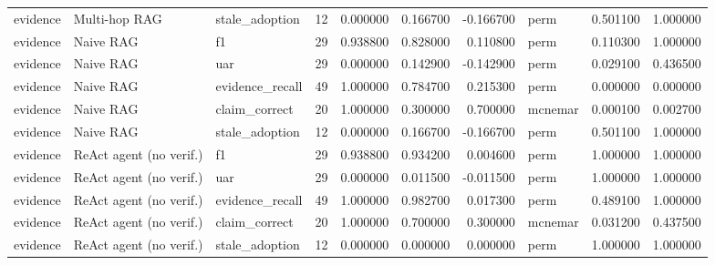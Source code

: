\begin{table}
\begin{tabular}{lllrrrrlrr}
evidence & Multi-hop RAG & stale\_adoption & 12 & 0.000000 & 0.166700 & -0.166700 & perm & 0.501100 & 1.000000 \\
evidence & Naive RAG & f1 & 29 & 0.938800 & 0.828000 & 0.110800 & perm & 0.110300 & 1.000000 \\
evidence & Naive RAG & uar & 29 & 0.000000 & 0.142900 & -0.142900 & perm & 0.029100 & 0.436500 \\
evidence & Naive RAG & evidence\_recall & 49 & 1.000000 & 0.784700 & 0.215300 & perm & 0.000000 & 0.000000 \\
evidence & Naive RAG & claim\_correct & 20 & 1.000000 & 0.300000 & 0.700000 & mcnemar & 0.000100 & 0.002700 \\
evidence & Naive RAG & stale\_adoption & 12 & 0.000000 & 0.166700 & -0.166700 & perm & 0.501100 & 1.000000 \\
evidence & ReAct agent (no verif.) & f1 & 29 & 0.938800 & 0.934200 & 0.004600 & perm & 1.000000 & 1.000000 \\
evidence & ReAct agent (no verif.) & uar & 29 & 0.000000 & 0.011500 & -0.011500 & perm & 1.000000 & 1.000000 \\
evidence & ReAct agent (no verif.) & evidence\_recall & 49 & 1.000000 & 0.982700 & 0.017300 & perm & 0.489100 & 1.000000 \\
evidence & ReAct agent (no verif.) & claim\_correct & 20 & 1.000000 & 0.700000 & 0.300000 & mcnemar & 0.031200 & 0.437500 \\
evidence & ReAct agent (no verif.) & stale\_adoption & 12 & 0.000000 & 0.000000 & 0.000000 & perm & 1.000000 & 1.000000 \\
\bottomrule
\end{tabular}
\end{table}
